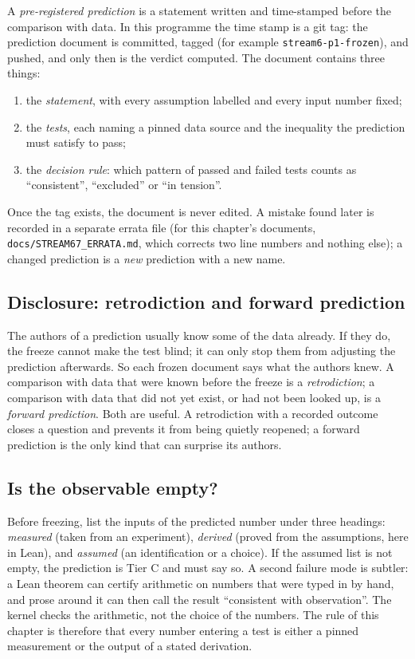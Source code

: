 A \emph{pre-registered prediction} is a statement written and time-stamped before the comparison
with data. In this programme the time stamp is a git tag: the prediction document is committed,
tagged (for example \texttt{stream6-p1-frozen}), and pushed, and only then is the verdict
computed. The document contains three things:
\begin{enumerate}[leftmargin=*,itemsep=1pt]
\item the \emph{statement}, with every assumption labelled and every input number fixed;
\item the \emph{tests}, each naming a pinned data source and the inequality the prediction must
 satisfy to pass;
\item the \emph{decision rule}: which pattern of passed and failed tests counts as
 ``consistent'', ``excluded'' or ``in tension''.
\end{enumerate}
Once the tag exists, the document is never edited. A mistake found later is recorded in a
separate errata file (for this chapter's documents, \texttt{docs/STREAM67\_ERRATA.md}, which
corrects two line numbers and nothing else); a changed prediction is a \emph{new} prediction
with a new name.

\subsection{Disclosure: retrodiction and forward prediction}

The authors of a prediction usually know some of the data already. If they do, the freeze
cannot make the test blind; it can only stop them from adjusting the prediction afterwards. So
each frozen document says what the authors knew. A comparison with data that were known before
the freeze is a \emph{retrodiction}; a comparison with data that did not yet exist, or had not
been looked up, is a \emph{forward prediction}. Both are useful. A retrodiction with a recorded
outcome closes a question and prevents it from being quietly reopened; a forward prediction is
the only kind that can surprise its authors.

\subsection{Is the observable empty?}

Before freezing, list the inputs of the predicted number under three headings: \emph{measured}
(taken from an experiment), \emph{derived} (proved from the assumptions, here in Lean), and
\emph{assumed} (an identification or a choice). If the assumed list is not empty, the prediction
is Tier C and must say so. A second failure mode is subtler: a Lean theorem can certify
arithmetic on numbers that were typed in by hand, and prose around it can then call the result
``consistent with observation''. The kernel checks the arithmetic, not the choice of the numbers.
The rule of this chapter is therefore that every number entering a test is either a pinned
measurement or the output of a stated derivation.

